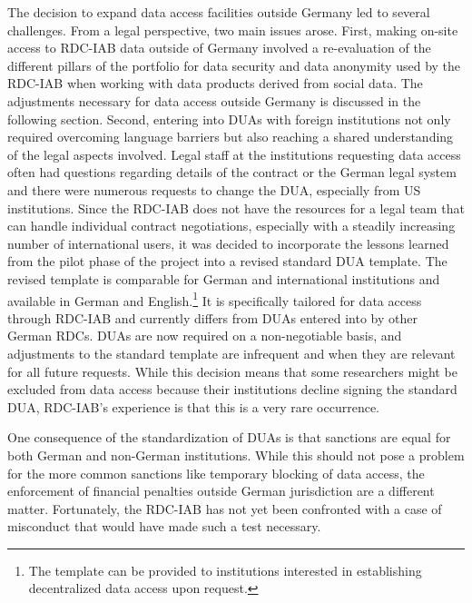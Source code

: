 The decision to expand data access facilities outside Germany led to several challenges. From a legal perspective, two main issues arose. First, making on-site access to RDC-IAB data outside of Germany involved a re-evaluation of the different pillars of the portfolio for data security and data anonymity used by the RDC-IAB when working with data products derived from social data. The adjustments necessary for data access outside Germany is discussed in the following section. Second, entering into DUAs with foreign institutions not only required overcoming language barriers but also reaching a shared understanding of the legal aspects involved. Legal staff at the institutions requesting data access often had questions regarding details of the contract or the German legal system and there were numerous requests to change the DUA, especially from US institutions. Since the RDC-IAB does not have the resources for a legal team that can handle individual contract negotiations, especially with a steadily increasing number of international users, it was decided to incorporate the lessons learned from the pilot phase of the project into a revised standard DUA template. The revised template is comparable for German and international institutions and available in German and English.\footnote{The template can be provided to institutions interested in establishing decentralized data access upon request.} It is specifically tailored for data access through RDC-IAB and currently differs from DUAs entered into by other German RDCs. DUAs are now required on a non-negotiable basis, and adjustments to the standard template are infrequent and when they are relevant for all future requests. While this decision means that some researchers might be excluded from data access because their institutions decline signing the standard DUA, RDC-IAB's experience is that this is a very rare occurrence.

One consequence of the standardization of DUAs is that sanctions are equal for both German and non-German institutions. While this should not pose a problem for the more common sanctions like temporary blocking of data access, the enforcement of financial penalties outside German jurisdiction are a different matter. Fortunately, the RDC-IAB has not yet been confronted with a case of misconduct that would have made such a test necessary.

